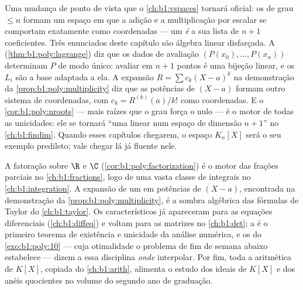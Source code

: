 \begin{remark}\label{rem:b1:poly:interlude}
Uma mudança de ponto de vista que o \cref{ch:b1:vspaces} tornará
oficial: os  de grau $\leq n$ formam um espaço em
que a adição e a multiplicação por escalar se comportam exatamente como
coordenadas --- um  \emph{é} a sua lista de $n + 1$
coeficientes. Três enunciados deste capítulo são álgebra linear
disfarçada. A  (\cref{thm:b1:poly:lagrange}) diz que
os dados de avaliação $(P(x_0), \dots, P(x_n))$ determinam $P$
de modo único: avaliar em $n + 1$ pontos é uma bijeção linear,
e os $L_i$ são a base adaptada a ela. A expansão $R =
\sum c_k(X - a)^k$ na demonstração da
\cref{prop:b1:poly:multiplicity} diz que as potências de
$(X - a)$ formam outro sistema de coordenadas, com $c_k =
R^{(k)}(a)/k!$ como coordenadas. E o
\cref{cor:b1:poly:nroots} --- mais raízes que o grau força
o  nulo --- é o motor de todas as unicidades: ele se tornará
``uma  linear  num espaço de dimensão $n + 1$''
no \cref{ch:b1:findim}. Quando esses capítulos chegarem, o espaço
$K_n[X]$ será o seu exemplo predileto; vale chegar lá já
fluente nele.
\end{remark}

\begin{remark}\label{rem:b1:poly:whereused}
A fatoração sobre $\R$ e $\C$
(\cref{cor:b1:poly:factorization}) é o motor das frações
parciais no \cref{ch:b1:fractions}, logo de uma vasta classe de
integrais no \cref{ch:b1:integration}. A expansão de um
 em potências de $(X - a)$, encontrada na demonstração da
\cref{prop:b1:poly:multiplicity}, é a sombra algébrica das
fórmulas de Taylor do \cref{ch:b1:taylor}. Os  característicos
já apareceram para as equações diferenciais (\cref{ch:b1:diffeq})
e voltam para as matrizes no \cref{ch:b1:det}; a  é o primeiro teorema de existência e unicidade da
análise numérica, e os  do
\cref{exo:b1:poly:10} --- cuja otimalidade o problema de fim de semana
abaixo estabelece --- dizem a essa disciplina \emph{onde}
interpolar. Por fim, toda a aritmética de $K[X]$, copiada do
\cref{ch:b1:arith}, alimenta o estudo dos ideais de $K[X]$ e dos anéis
quocientes no volume do segundo ano de graduação.
\end{remark}

